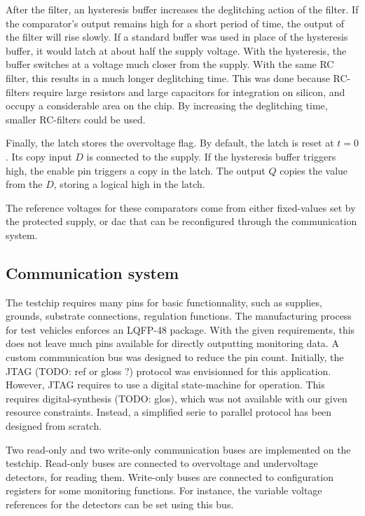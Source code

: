 After the filter, an hysteresis buffer increases the deglitching action of the filter.
If the comparator's output remains high for a short period of time, the output of the filter will rise slowly.
If a standard buffer was used in place of the hysteresis buffer, it would latch at about half the supply voltage.
With the hysteresis, the buffer switches at a voltage much closer from the supply.
With the same RC filter, this results in a much longer deglitching time.
This was done because RC-filters require large resistors and large capacitors for integration on silicon, and occupy a considerable area on the chip.
By increasing the deglitching time, smaller RC-filters could be used.

Finally, the latch stores the overvoltage flag.
By default, the latch is reset at $t=0$.
Its copy input $D$ is connected to the supply.
If the hysteresis buffer triggers high, the enable pin triggers a copy in the latch.
The output $Q$ copies the value from the $D$, storing a logical high in the latch.

The reference voltages for these comparators come from either fixed-values set by the protected supply, or \gls{dac} that can be reconfigured through the communication system.

\subsection{Communication system}
\label{sec:comm-system-testchip}

The testchip requires many pins for basic functionnality, such as supplies, grounds, substrate connections, regulation functions.
The manufacturing process for test vehicles enforces an LQFP-48 package.
With the given requirements, this does not leave much pins available for directly outputting monitoring data.
A custom communication bus was designed to reduce the pin count.
Initially, the JTAG (TODO: ref or gloss ?) protocol was envisionned for this application.
However, JTAG requires to use a digital state-machine for operation.
This requires digital-synthesis (TODO: glos), which was not available with our given resource constraints.
Instead, a simplified serie to parallel protocol has been designed from scratch.

Two read-only and two write-only communication buses are implemented on the testchip.
Read-only buses are connected to overvoltage and undervoltage detectors, for reading them.
Write-only buses are connected to configuration registers for some monitoring functions.
For instance, the variable voltage references for the detectors can be set using this bus.

